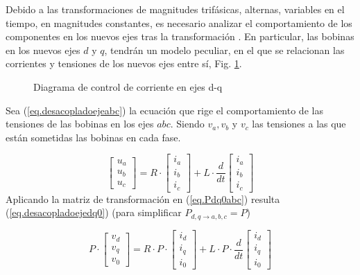 \documentclass{report}
\begin{document}
Debido a las transformaciones de magnitudes trifásicas, alternas, variables en el tiempo, en magnitudes constantes, es necesario analizar el comportamiento de los componentes en los nuevos ejes tras la transformación \cite{treintaytres,treintayocho,treintaynueve}.
En particular, las bobinas en los nuevos ejes $d$ y $q$, tendrán un modelo peculiar, en el que se relacionan las corrientes y tensiones de los nuevos ejes entre sí, Fig. \ref{fig.control-corriente-acoplamiento}.

\begin{figure}[!h]
    \begin{center}
    \end{center}
    \caption{Diagrama de control de corriente en ejes d-q \cite{doce}}
    \label{fig.control-corriente-acoplamiento}
    \end{figure}

    
Sea (\ref{eq.desacopladoejeabc}) la ecuación que rige el comportamiento de las tensiones de las bobinas en los ejes $abc$. Siendo $v_a, v_b$ y $v_c$ las tensiones a las que están sometidas las bobinas en cada fase.   

\begin{equation}
\left[\begin{array}{c}u_{a} \\ u_{b} \\ u_{c}\end{array}\right] = R \cdot \left[\begin{array}{c}i_{a} \\ i_{b} \\ i_{c}\end{array}\right]+ L \cdot \frac{d}{dt} \left[\begin{array}{c}i_{a} \\ i_{b} \\ i_{c}\end{array}\right]  \label{eq.desacopladoejeabc}
\end{equation}
Aplicando la matriz de transformación en (\ref{eq.Pdq0abc}) resulta (\ref{eq.desacopladoejedq0}) (para simplificar $P_{d,q\to a,b,c} = P$)

\begin{equation}
P \cdot \left[\begin{array}{c}v_{d} \\ v_{q} \\ v_{0}\end{array}\right] = R \cdot P \cdot \left[\begin{array}{c}i_{d} \\ i_{q} \\ i_{0}\end{array}\right]+ L \cdot P \cdot \frac{d}{dt} \left[\begin{array}{c}i_{d} \\ i_{q} \\ i_{0}\end{array}\right]  \label{eq.desacopladoejedq0}
\end{equation}
\end{document}
